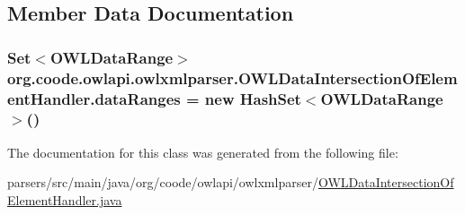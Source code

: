 \subsection{Member Data Documentation}
\hypertarget{classorg_1_1coode_1_1owlapi_1_1owlxmlparser_1_1_o_w_l_data_intersection_of_element_handler_a020ecc9d01f8bc45c2b2f4bae3300b65}{
\subsubsection[{data\-Ranges}]{\setlength{\rightskip}{0pt plus 5cm}Set$<${\bf O\-W\-L\-Data\-Range}$>$ org.\-coode.\-owlapi.\-owlxmlparser.\-O\-W\-L\-Data\-Intersection\-Of\-Element\-Handler.\-data\-Ranges = new Hash\-Set$<${\bf O\-W\-L\-Data\-Range}$>$()\hspace{0.3cm}{\ttfamily [private]}}}\label{classorg_1_1coode_1_1owlapi_1_1owlxmlparser_1_1_o_w_l_data_intersection_of_element_handler_a020ecc9d01f8bc45c2b2f4bae3300b65}


The documentation for this class was generated from the following file\-:\begin{DoxyCompactItemize}
\item 
parsers/src/main/java/org/coode/owlapi/owlxmlparser/\hyperlink{_o_w_l_data_intersection_of_element_handler_8java}{O\-W\-L\-Data\-Intersection\-Of\-Element\-Handler.\-java}\end{DoxyCompactItemize}
